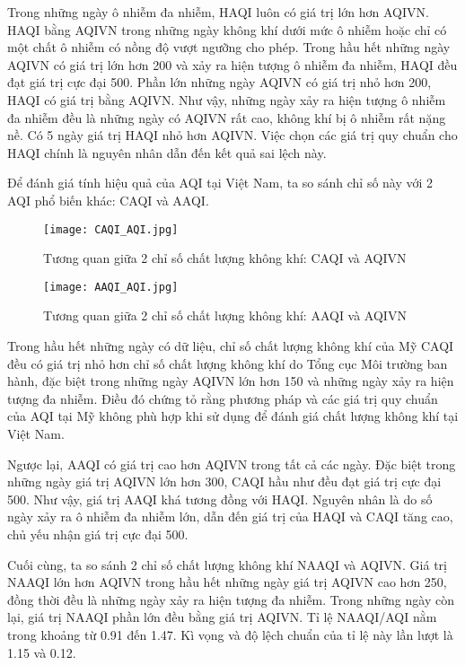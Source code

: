 \documentclass[14pt]{extreport}
\theoremstyle{definition}
\theoremstyle{plain}
\theoremstyle{remark}
\begin{document}
Trong những ngày ô nhiễm đa nhiễm, HAQI luôn có giá trị lớn hơn AQIVN. HAQI bằng AQIVN trong những ngày không khí dưới mức ô nhiễm hoặc chỉ có một chất ô nhiễm có nồng độ vượt ngưỡng cho phép. Trong hầu hết những ngày AQIVN có giá trị lớn hơn 200 và xảy ra hiện tượng ô nhiễm đa nhiễm, HAQI đều đạt giá trị cực đại 500. Phần lớn những ngày AQIVN có giá trị nhỏ hơn 200, HAQI có giá trị bằng AQIVN. Như vậy, những ngày xảy ra hiện tượng ô nhiễm đa nhiễm đều là những ngày có AQIVN rất cao, không khí bị ô nhiễm rất nặng nề. Có 5 ngày giá trị HAQI nhỏ hơn AQIVN. Việc chọn các giá trị quy chuẩn cho HAQI chính là nguyên nhân dẫn đến kết quả sai lệch này.

Để đánh giá tính hiệu quả của AQI tại Việt Nam, ta so sánh chỉ số này với 2 AQI phổ biến khác: CAQI và AAQI.

\begin{figure}
\begin{center}
\texttt{[image: CAQI\_AQI.jpg]}
\end{center}
\caption{Tương quan giữa 2 chỉ số chất lượng không khí: CAQI và AQIVN}

\begin{center}
\texttt{[image: AAQI\_AQI.jpg]}
\end{center}
\caption{Tương quan giữa 2 chỉ số chất lượng không khí: AAQI và AQIVN}
\end{figure}

Trong hầu hết những ngày có dữ liệu, chỉ số chất lượng không khí của Mỹ CAQI đều có giá trị nhỏ hơn chỉ số chất lượng không khí do Tổng cục Môi trường ban hành, đặc biệt trong những ngày AQIVN lớn hơn 150 và những ngày xảy ra hiện tượng đa nhiễm. Điều đó chứng tỏ rằng phương pháp và các giá trị quy chuẩn của AQI tại Mỹ không phù hợp khi sử dụng để đánh giá chất lượng không khí tại Việt Nam.
 
Ngược lại, AAQI có giá trị cao hơn AQIVN trong tất cả các ngày. Đặc biệt trong những ngày giá trị AQIVN lớn hơn 300, CAQI hầu như đều đạt giá trị cực đại 500. Như vậy, giá trị AAQI khá tương đồng với HAQI. Nguyên nhân là do số ngày xảy ra ô nhiễm đa nhiễm lớn, dẫn đến giá trị của HAQI và CAQI tăng cao, chủ yếu nhận giá trị cực đại 500.

		Cuối cùng, ta so sánh 2 chỉ số chất lượng không khí NAAQI và AQIVN. Giá trị NAAQI lớn hơn AQIVN trong hầu hết những ngày giá trị AQIVN cao hơn 250, đồng thời đều là những ngày xảy ra hiện tượng đa nhiễm. Trong những ngày còn lại, giá trị NAAQI phần lớn đều bằng giá trị AQIVN. Tỉ lệ NAAQI/AQI nằm trong khoảng từ 0.91 đến 1.47. Kì vọng và độ lệch chuẩn của tỉ lệ này lần lượt là 1.15 và 0.12. 
		
\end{document}
